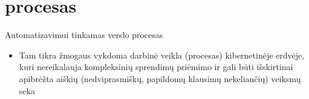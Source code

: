 \section{procesas}

\begin{frame}[c]{Automatizavimui tinkamas verslo procesas}

\begin{itemize}
    \item Tam tikra žmogaus vykdoma darbinė veikla (procesas) kibernetinėje erdvėje, kuri nereikalauja kompleksinių sprendimų priėmimo ir gali būti išskirtinai apibrėžta aiškių (nedviprasmiškų, papildomų klausimų nekeliančių) veiksmų seka
\end{itemize}

\end{frame}